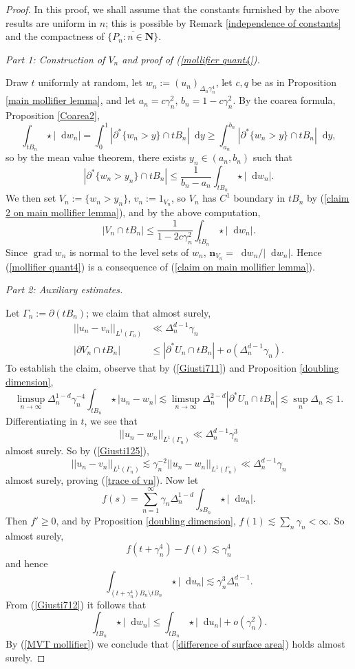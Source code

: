 \documentclass[reqno,12pt,letterpaper]{amsart}
\newcommand{\NN}{\mathbf{N}}
\newcommand*\dif{\mathop{}\!\mathrm{d}}
\DeclareMathOperator{\grad}{grad}
\newcommand{\normal}{\mathbf n}
\theoremstyle{definition}
\newcommand{\proofpart}[2]{%
  \par
  \addvspace{\medskipamount}%
  \noindent\emph{Part #1: #2.}
}
\numberwithin{equation}{section}
\begin{document}
\begin{proof}
In this proof, we shall assume that the constants furnished by the above results are uniform in $n$; this is possible by Remark \ref{independence of constants} and the compactness of $\overline{\{P_n: n \in \NN\}}$.

\proofpart{1}{Construction of $V_n$ and proof of (\ref{mollifier quant4})}
Draw $t$ uniformly at random, let $w_n := (u_n)_{\Delta_n \gamma_n^4}$, let $c, q$ be as in Proposition \ref{main mollifier lemma}, and let $a_n = c\gamma_n^2$, $b_n = 1 - c\gamma_n^2$.
By the coarea formula, Proposition \ref{Coarea2},
$$\int_{tB_n} \star |\dif w_n| = \int_0^1 |\partial^* \{w_n > y\} \cap tB_n| \dif y \geq \int_{a_n}^{b_n} |\partial^* \{w_n > y\} \cap tB_n| \dif y,$$
so by the mean value theorem, there exists $y_n \in (a_n, b_n)$ such that
$$|\partial^* \{w_n > y_n\} \cap tB_n| \leq \frac{1}{b_n - a_n} \int_{tB_n} \star |\dif w_n|.$$
We then set $V_n := \{w_n > y_n\}$, $v_n := 1_{V_n}$, so $V_n$ has $C^1$ boundary in $tB_n$ by (\ref{claim 2 on main mollifier lemma}), and by the above computation,
\begin{equation}\label{MVT mollifier}
|V_n \cap tB_n| \leq \frac{1}{1 - 2c\gamma_n^2} \int_{tB_n} \star |\dif w_n|.
\end{equation}
Since $\grad w_n$ is normal to the level sets of $w_n$, $\normal_{V_n} = \dif w_n/|\dif w_n|$.
Hence (\ref{mollifier quant4}) is a consequence of (\ref{claim on main mollifier lemma}).

\proofpart{2}{Auxiliary estimates}
Let $\Gamma_n := \partial(tB_n)$; we claim that almost surely,
\begin{align}
||u_n - v_n||_{L^1(\Gamma_n)} &\ll \Delta_n^{d - 1} \gamma_n \label{trace of vn} \\
|\partial V_n \cap tB_n| &\leq |\partial^* U_n \cap tB_n| + o(\Delta_n^{d - 1} \gamma_n). \label{difference of surface area}
\end{align}
To establish the claim, observe that by (\ref{Giusti711}) and Proposition \ref{doubling dimension},
$$\limsup_{n \to \infty} \Delta_n^{1 - d} \gamma_n^{-4} \int_{tB_n} \star |u_n - w_n| \lesssim \limsup_{n \to \infty} \Delta_n^{2-d} |\partial^* U_n \cap tB_n| \lesssim \sup_n \Delta_n \lesssim 1.$$
Differentiating in $t$, we see that
$$||u_n - w_n||_{L^1(\Gamma_n)} \ll \Delta_n^{d - 1} \gamma_n^3$$
almost surely. So by (\ref{Giusti125}),
$$||u_n - v_n||_{L^1(\Gamma_n)} \lesssim \gamma_n^{-2} ||u_n - w_n||_{L^1(\Gamma_n)} \ll \Delta_n^{d - 1} \gamma_n$$
almost surely, proving (\ref{trace of vn}).
Now let
$$f(s) = \sum_{n=1}^\infty \gamma_n \Delta_n^{1 - d} \int_{sB_n} \star |\dif u_n|.$$
Then $f' \geq 0$, and by Proposition \ref{doubling dimension}, $f(1) \lesssim \sum_n \gamma_n < \infty$.
So almost surely,
$$f(t + \gamma_n^4) - f(t) \lesssim \gamma_n^4$$
and hence
$$\int_{(t + \gamma_n^4)B_n \setminus tB_n} \star |\dif u_n| \lesssim \gamma_n^3 \Delta_n^{d - 1}.$$
From (\ref{Giusti712}) it follows that
$$\int_{tB_n} \star |\dif w_n| \leq \int_{tB_n} \star |\dif u_n| + o(\gamma_n^2).$$
By (\ref{MVT mollifier}) we conclude that (\ref{difference of surface area}) holds almost surely.


\end{proof}
\end{document}
